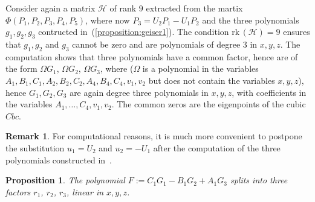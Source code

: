 \documentclass[11pt, a4paper, reqno, captions=tableheading,bibliography=totoc]{scrartcl}
\theoremstyle{plain}
\newtheorem{prop}[lemma]{Proposition}
\theoremstyle{definition}
\newtheorem{rmk}[lemma]{Remark}
\newcommand{\cbc}{\ensuremath{Cbc}}
\newcommand{\rk}{\ensuremath{\mathrm{rk}}}
\begin{document}
Consider again a matrix $\mathcal{H}$ of rank $9$ extracted from
the martix $\Phi(P_1, P_2, P_3, P_4, P_5)$, where now $P_3 = U_2P_1-U_1P_2$
and the three polynomials $g_1, g_2, g_3$ contructed
in~(\ref{proposition:geiser1}). The condition
$\rk \,(\mathcal{H}) = 9$ ensures that
$g_1, g_2$ and $g_3$ cannot be zero and are polynomials of degree
$3$ in $x, y, z$.
The computation shows that three polynomials have a common factor,
hence are of the form $\Omega G_1$, $\Omega G_2$, $\Omega G_3$, where
($\Omega$ is a polynomial in the variables
$A_1, B_1, C_1, A_2, B_2, C_2, A_4, B_4, C_4, v_1, v_2$ but
does not contain the variables $x, y, z$), hence $G_1, G_2, G_3$ are again
degree three polynomials in $x, y, z$, with coefficients in the variables
$A_1, \dots, C_4, v_1, v_2$. The common zeros are the eigenpoints of the
cubic $\cbc$.
%
\begin{rmk} For computational reasons, it is much more convenient
to postpone the substitution $u_1 = U_2$ and $u_2 = -U_1$ after the 
computation of the three polynomials constructed
in~.
\end{rmk}
%
\begin{prop}
\label{proposition:G_split}
 The polynomial
$F := C_1G_1-B_1G_2+A_1G_3$ splits into three factors $r_1$, $r_2$, $r_3$,
linear in $x, y, z$.
\end{prop}
\end{document}
